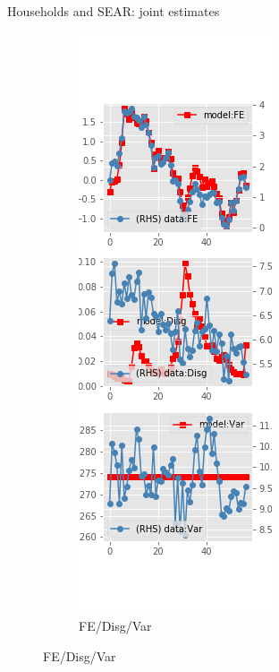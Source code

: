 \documentclass{beamer}
\begin{document}
\begin{frame}{Households and SEAR: joint estimates}
\begin{figure}[ht]
\begin{subfigure}[b]{0.2\textwidth}
		\end{subfigure}
		\hfill
		\begin{subfigure}[b]{0.2\textwidth}
			\caption{FE/Disg/Var}
			\includegraphics[width=\textwidth, height = 0.8\textheight]{figuresDraft/sce_se_est_diag3.png}
		\end{subfigure}
		\hfill
	\end{figure}
\end{frame}
\end{document}
